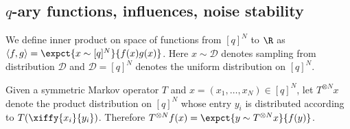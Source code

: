 \subsection{\texorpdfstring{$q$-ary functions, influences, noise stability}{q-ary functions, influences, noise stability}}
%
We define inner product on space of functions from $[q]^N$ to
$\R$ as $\langle f,g \rangle = \expct{x\sim[q]^N}{f(x)
  g(x)}$. Here $x \sim \mathcal{D}$ denotes sampling from distribution
$\mathcal{D}$ and $\mathcal{D} = [q]^N$ denotes the uniform
distribution on $[q]^N$.

Given a symmetric Markov operator $T$ and
$x=(x_1,\ldots,x_N)\in[q]^N$, let $T^{\otimes N} x$ denote the product
distribution on $[q]^N$ whose  entry $y_i$ is
distributed according to $T(\xiffy{x_i}{y_i})$. Therefore $T^{\otimes
  N} f (x) = \expct{y \sim T^{\otimes N} x} { f(y)}$.


